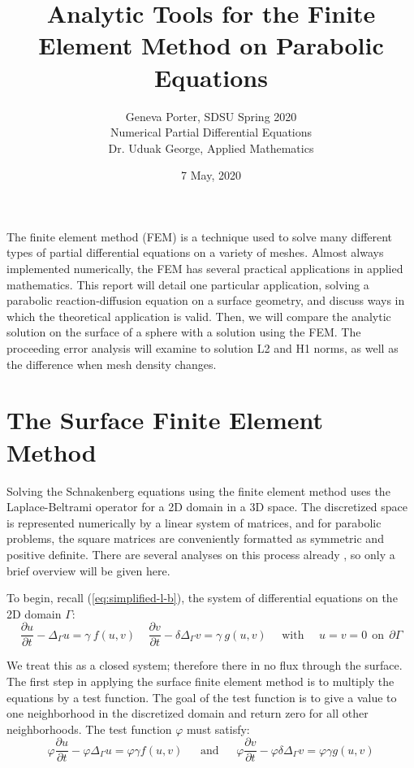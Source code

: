 \documentclass[12pt]{article}
\title{Analytic Tools for the Finite Element Method on Parabolic Equations}
\author{Geneva Porter, SDSU Spring 2020\\ 
Numerical Partial Differential Equations\\
Dr. Uduak George, Applied Mathematics}
\date{7 May, 2020}
\begin{document}
\maketitle

The finite element method (FEM) is a technique used to solve many different types of partial differential equations on a variety of meshes. Almost always implemented numerically, the FEM has several practical applications in applied mathematics. This report will detail one particular application, solving a parabolic reaction-diffusion equation on a surface geometry, and discuss ways in which the theoretical application is valid. Then, we will compare the analytic solution on the surface of a sphere with a solution using the FEM. The proceeding error analysis will examine to solution L2 and H1 norms, as well as the difference when mesh density changes.

\section{The Surface Finite Element Method}\label{sec:SFEM}

Solving the Schnakenberg equations using the finite element method uses the Laplace-Beltrami operator for a 2D domain in a 3D space. The discretized space is represented numerically by a linear system of matrices, and for parabolic problems, the square matrices are conveniently formatted as symmetric and positive definite. There are several analyses on this process already \cite{Dziuk1988} \cite{Dziuk2013}, so only a brief overview will be given here. 

To begin, recall (\ref{eq:simplified-l-b}), the system of differential equations on the 2D domain $\Gamma$:
\begin{equation}
\frac{\partial u}{\partial t} - \Delta_\Gamma u = \gamma~f(u,v) ~~~~~
\frac{\partial v}{\partial t} - \delta\Delta_\Gamma v = \gamma~g(u,v) ~~~~~~ \text{with} ~~~~~~ u = v = 0 ~~ \text{on} ~~ \partial\Gamma
\end{equation}

We treat this as a closed system; therefore there in no flux through the surface. The first step in applying the surface finite element method is to multiply the equations by a test function. The goal of the test function is to give a value to one neighborhood in the discretized domain and return zero for all other neighborhoods. The test function $\varphi$ must satisfy:
\begin{equation}
\varphi\frac{\partial u}{\partial t} - \varphi\Delta_\Gamma u = \varphi\gamma f(u,v) ~~~~~~~ \text{and} ~~~~~~~
\varphi\frac{\partial v}{\partial t} - \varphi\delta\Delta_\Gamma v = \varphi\gamma g(u,v)
\end{equation}
\end{document}
